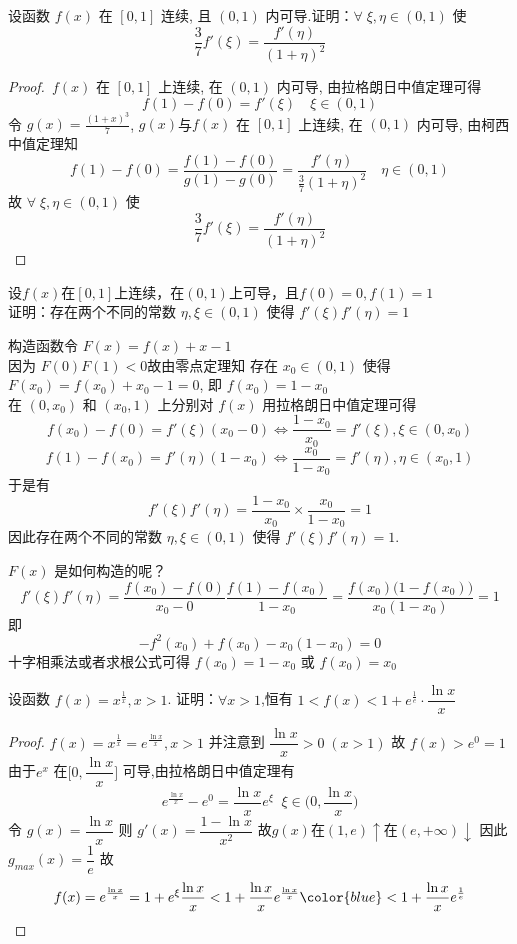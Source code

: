 \documentclass[color=green,titlestyle=hang]{elegantbook}%
\begin{document}
\begin{example}
设函数 $f(x)$ 在 $[0,1]$ 连续, 且 $(0,1)$ 内可导.证明：$\forall\;\xi,\eta\in(0,1)$ 使 \[\frac{3}{7}f'(\xi)=\frac{f'(\eta)}{(1+\eta)^2}\]
\end{example}\begin{proof}
\,$f(x)$ 在 $[0,1]$ 上连续,  在 $(0,1)$ 内可导, 由拉格朗日中值定理可得
\[f(1)-f(0)=f'(\xi)\quad\xi\in(0,1)\]
令 $g(x)=\frac{(1+x)^3}{7}$,  $g(x)$与$f(x)$ 在 $[0,1]$ 上连续,  在 $(0,1)$ 内可导, 由柯西中值定理知  \[f(1)-f(0)=\frac{f(1)-f(0)}{g(1)-g(0)}=\frac{f'(\eta)}{\frac{3}{7}(1+\eta)^2}\quad\eta\in(0,1)\]
故 $\forall\;\xi,\eta\in(0,1)$ 使 \[\frac{3}{7}f'(\xi)=\frac{f'(\eta)}{(1+\eta)^2}\]	
\end{proof}

\begin{example}
设$f(x)$在$[0,1]$上连续，在$(0,1)$上可导，且$f(0)=0,f(1)=1$\,\\
证明：存在两个不同的常数 $\eta,\xi\in(0,1)$ 使得 $f'(\xi)f'(\eta)=1$
\end{example}\begin{solution}
构造函数令 $F(x)=f(x)+x-1$\\
因为 $F(0)F(1)<0$故由零点定理知 存在 $x_0\in(0,1)$ 使得 $F(x_0)=f(x_0)+x_0-1=0$, 即 $f(x_0)=1-x_0$\\
在 $(0,x_0)$ 和 $(x_0,1)$ 上分别对 $f(x)$ 用拉格朗日中值定理可得
\[f(x_0)-f(0)=f'(\xi)(x_0-0)\Leftrightarrow \frac{1-x_0}{x_0}=f'(\xi),\xi\in(0,x_0)\]
\[f(1)-f(x_0)=f'(\eta)(1-x_0)\Leftrightarrow \frac{x_0}{1-x_0}=f'(\eta),\eta\in(x_0,1)\]
于是有
\[f'(\xi)f'(\eta)=\frac{1-x_0}{x_0}\times\frac{x_0}{1-x_0}=1\]
因此存在两个不同的常数 $\eta,\xi\in(0,1)$ 使得 $f'(\xi)f'(\eta)=1$. 
\end{solution}
\begin{remark}
$F(x)$ 是如何构造的呢？%
\[f'(\xi)f'(\eta)
=\frac{f(x_0)-f(0)}{x_0-0}\frac{f(1)-f(x_0)}{1-x_0}=\frac{f(x_0)\big(1-f(x_0)\big)}{x_0(1-x_0)}=1\]
即
\[-f^2(x_0)+f(x_0)-x_0(1-x_0)=0\]
十字相乘法或者求根公式可得 $f(x_0)=1-x_0$ 或 $f(x_0)=x_0$
\end{remark}

\begin{example}
设函数 $f(x)=x^{\frac{1}{x}}, x>1$. 证明：$\forall x>1$,恒有 $ 1<f(x)<1+e^{\frac{1}{e}}\cdot\dfrac{\ln x}{x}$
\end{example}\begin{proof}
$f(x)=x^{\frac{1}{x}}=e^{\frac{\ln x}{x}}, x>1$ 并注意到 $\dfrac{\ln x}{x}>0\;(x>1)$ 故 $\displaystyle f(x)>e^0=1$\\[1mm]
由于$e^x$ 在$\Big[0,\dfrac{\ln x}{x}\Big]$ 可导,由拉格朗日中值定理有
\begin{equation*}
e^{\frac{\ln x}{x}}-e^{0}=\frac{\ln x}{x}e^{\xi}\;\;\xi\in\Big(0,\dfrac{\ln x}{x}\Big)
\end{equation*}
令 $g(x)=\dfrac{\ln x}{x}$ 则 $g'(x)=\dfrac{1-\ln x}{x^2}$ 故$g(x)$在$(1,e)\uparrow$在$(e,+\infty)\downarrow$ 因此$g_{max}(x)=\dfrac{1}{e}$
故\begin{equation*}
f(x)=e^{\frac{\ln x}{x}}=1+e^{\xi}\frac{\ln x}{x}<1+\frac{\ln x}{x}e^{\frac{\ln x}{x}}{\color{blue}<1+\frac{\ln x}{x}e^{\frac{1}{e}}}
\end{equation*}
\end{proof}
\end{document}
